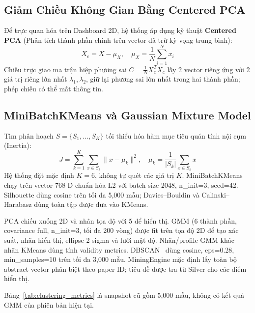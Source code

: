 \subsection{Giảm Chiều Không Gian Bằng Centered PCA}
Để trực quan hóa trên Dashboard 2D, hệ thống áp dụng kỹ thuật \textbf{Centered PCA} (Phân tích thành phần chính trên vector đã trừ kỳ vọng trung bình):
\begin{equation}
  X_c = X - \mu_X, \quad \mu_X = \frac{1}{N}\sum_{i=1}^N x_i
\end{equation}
Chiếu trực giao ma trận hiệp phương sai $C = \frac{1}{N} X_c^T X_c$ lấy 2 vector riêng ứng với 2 giá trị riêng lớn nhất $\lambda_1, \lambda_2$, giữ lại phương sai lớn nhất trong hai thành phần; phép chiếu có thể mất thông tin.

\subsection{MiniBatchKMeans và Gaussian Mixture Model}
Tìm phân hoạch $S = \{S_1, \dots, S_K\}$ tối thiểu hóa hàm mục tiêu quán tính nội cụm (Inertia):
\begin{equation}
  J = \sum_{k=1}^K \sum_{x \in S_k} \|x - \mu_k\|^2, \quad \mu_k = \frac{1}{|S_k|}\sum_{x \in S_k} x
\end{equation}
Hệ thống đặt mặc định $K=6$, không tự quét các giá trị $K$. MiniBatchKMeans chạy trên vector 768-D chuẩn hóa L2 với batch size 2048, n\_init=3, seed=42. Silhouette dùng cosine trên tối đa 5,000 mẫu; Davies--Bouldin và Calinski--Harabasz dùng toàn tập được đưa vào KMeans.

PCA chiếu xuống 2D và nhân tọa độ với 5 để hiển thị. GMM (6 thành phần, covariance full, n\_init=3, tối đa 200 vòng) được fit trên tọa độ 2D để tạo xác suất, nhãn hiển thị, ellipse 2-sigma và lưới mật độ. Nhãn/profile GMM khác nhãn KMeans dùng tính validity metrics. DBSCAN~\cite{ester1996density} dùng cosine, eps=0.28, min\_samples=10 trên tối đa 3,000 mẫu. MiningEngine mặc định lấy toàn bộ abstract vector phân biệt theo paper ID; tiêu đề được tra từ Silver cho các điểm hiển thị.

Bảng~\ref{tab:clustering_metrics} là snapshot cũ gồm 5,000 mẫu, không có kết quả GMM của phiên bản hiện tại.



